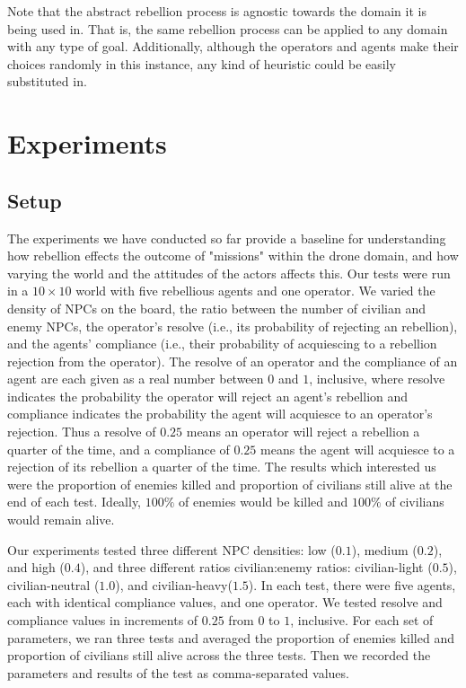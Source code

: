 \documentclass[letterpaper,11pt]{article}
\begin{document}
	Note that the abstract rebellion process is agnostic towards the domain it is being used in. That is, the same rebellion process can be applied to any domain with any type of goal. Additionally, although the operators and agents make their choices randomly in this instance, any kind of heuristic could be easily substituted in. \par
	
	\section{Experiments}
	\subsection{Setup}
	The experiments we have conducted so far provide a baseline for understanding how rebellion effects the outcome of "missions" within the drone domain, and how varying the world and the attitudes of the actors affects this. Our tests were run in a $10 \times 10$ world with five rebellious agents and one operator. We varied the density of NPCs on the board, the ratio between the number of civilian and enemy NPCs, the operator's resolve (i.e., its probability of rejecting an rebellion), and the agents' compliance (i.e., their probability of acquiescing to a rebellion rejection from the operator). The resolve of an operator and the compliance of an agent are each given as a real number between $ 0 $ and $ 1 $, inclusive, where resolve indicates the probability the operator will reject an agent's rebellion and compliance indicates the probability the agent will acquiesce to an operator's rejection. Thus a resolve of $0.25$ means an operator will reject a rebellion a quarter of the time, and a compliance of $0.25$ means the agent will acquiesce to a rejection of its rebellion a quarter of the time. The results which interested us were the proportion of enemies killed and proportion of civilians still alive at the end of each test. Ideally, $100\%$ of enemies would be killed and $100\%$ of civilians would remain alive. 
	
	Our experiments tested three different NPC densities: low ($0.1$), medium ($0.2$), and high ($0.4$), and three different ratios civilian:enemy ratios: civilian-light ($0.5$), civilian-neutral ($1.0$), and civilian-heavy($1.5$). In each test, there were five agents, each with identical compliance values, and one operator. We tested resolve and compliance values in increments of $0.25$ from $0$ to $1$, inclusive. For each set of parameters, we ran three tests and averaged the proportion of enemies killed and proportion of civilians still alive across the three tests. Then we recorded the parameters and results of the test as comma-separated values. \par
	
\end{document}

